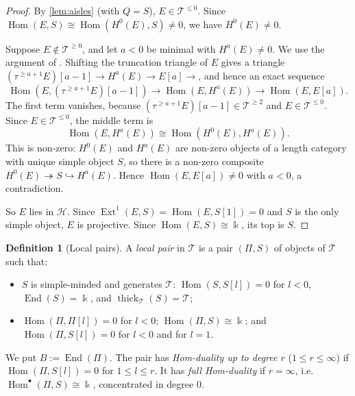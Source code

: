 \documentclass[11pt,reqno]{amsart}
\theoremstyle{plain}
\theoremstyle{definition}
\newtheorem{definition}[theorem]{Definition}
\theoremstyle{remark}
\newcommand{\kk}{\Bbbk}
\DeclareMathOperator{\Hom}{Hom}
\DeclareMathOperator{\End}{End}
\DeclareMathOperator{\Ext}{Ext}
\newcommand{\thick}[2][\cD]{\operatorname{thick}_{#1}(#2)}
\newcommand{\cD}{\mathcal{D}}
\newcommand{\cH}{\mathcal{H}}
\newcommand{\cT}{\mathcal{T}}
\begin{document}
\begin{proof}
By \cref{lem:aisles} (with $Q=S$), $E\in\cT^{\le0}$. Since $\Hom(E,S)\cong\Hom(H^0(E),S)\neq0$, we have $H^0(E)\ne0$.

Suppose $E\notin\cT^{\ge0}$, and let $a<0$ be minimal with $H^a(E)\ne0$. We use the argument of \cite[Lemma~3.12]{Bonf26}. Shifting the truncation triangle of $E$ gives a triangle $(\tau^{\ge a+1}E)[a-1]\to H^a(E)\to E[a]\to$, and hence an exact sequence
\[\Hom(E,(\tau^{\ge a+1}E)[a-1])\to\Hom(E,H^a(E))\to\Hom(E,E[a]).\]
The first term vanishes, because $(\tau^{\ge a+1}E)[a-1]\in\cT^{\ge2}$ and $E\in\cT^{\le0}$. Since $E\in\cT^{\le0}$, the middle term is
\[\Hom(E,H^a(E))\cong\Hom(H^0(E),H^a(E)).\]
This is non-zero: $H^0(E)$ and $H^a(E)$ are non-zero objects of a length category with unique simple object $S$, so there is a non-zero composite $H^0(E)\twoheadrightarrow S\hookrightarrow H^a(E)$. Hence $\Hom(E,E[a])\ne0$ with $a<0$, a contradiction.

So $E$ lies in $\cH$. Since $\Ext^1(E,S)=\Hom(E,S[1])=0$ and $S$ is the only simple object, $E$ is projective. Since $\Hom(E,S)\cong\kk$, its top is $S$.
\end{proof}

\begin{definition}[Local pairs]\label{def:local-pair}
A \emph{local pair} in $\cT$ is a pair $(\Pi,S)$ of objects of $\cT$ such that:
\begin{itemize}
\item[\textup{(LP1)}] $S$ is simple-minded and generates $\cT$: $\Hom(S,S[l])=0$ for $l<0$, $\End(S)=\kk$, and $\thick[\cT]{S}=\cT$;
\item[\textup{(LP2)}] $\Hom(\Pi,\Pi[l])=0$ for $l<0$; $\Hom(\Pi,S)\cong\kk$; and $\Hom(\Pi,S[l])=0$ for $l<0$ and for $l=1$.
\end{itemize}
We put $B:=\End(\Pi)$. The pair has \emph{Hom-duality up to degree $r$} ($1\le r\le\infty$) if $\Hom(\Pi,S[l])=0$ for $1\le l\le r$. It has \emph{full Hom-duality} if $r=\infty$, i.e.\ $\Hom^\bullet(\Pi,S)\cong\kk$, concentrated in degree $0$.
\end{definition}
\end{document}
